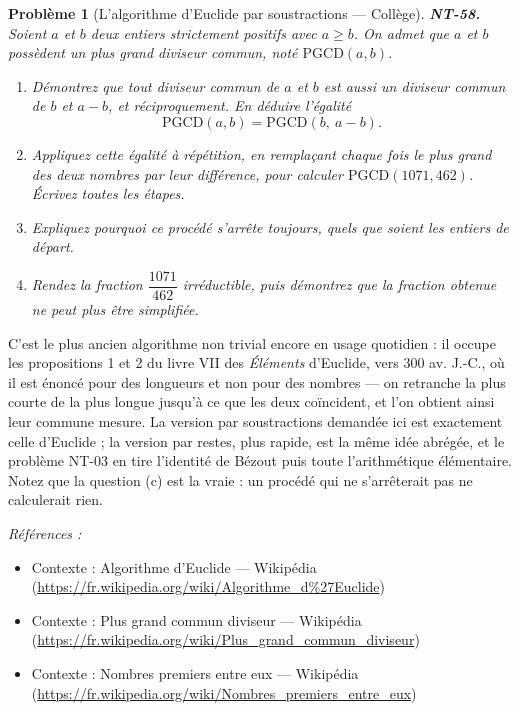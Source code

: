 \documentclass[11pt]{article}
\newtheorem{problem}{Problème}
\newenvironment{refs}{\par\small\noindent\emph{Références :}\begin{itemize}\setlength\itemsep{0pt}}{\end{itemize}\normalsize}
\begin{document}
\bigskip

\begin{problem}[{L'algorithme d'Euclide par soustractions --- Collège}]
\textbf{NT-58.} Soient $ a $ et $ b $ deux entiers strictement positifs avec
$ a \ge b $. On admet que $ a $ et $ b $ possèdent un plus grand diviseur commun, noté
$ \mathrm{PGCD}(a, b) $.
\begin{enumerate}
\item[(a)] Démontrez que tout diviseur commun de $ a $ et $ b $ est aussi un diviseur commun de $ b $
et $ a - b $, et réciproquement. En déduire l'égalité
\[ \mathrm{PGCD}(a, b) = \mathrm{PGCD}(b,\ a - b) . \]
\item[(b)] Appliquez cette égalité à répétition, en remplaçant chaque fois le plus grand des deux nombres
par leur différence, pour calculer $ \mathrm{PGCD}(1071, 462) $. Écrivez toutes les étapes.
\item[(c)] Expliquez pourquoi ce procédé s'arrête toujours, quels que soient les entiers de départ.
\item[(d)] Rendez la fraction $ \dfrac{1071}{462} $ irréductible, puis démontrez que la fraction obtenue ne
peut plus être simplifiée.
\end{enumerate}

\end{problem}

\noindent C'est le plus ancien algorithme non trivial encore en usage quotidien : il occupe
les propositions 1 et 2 du livre VII des \textit{Éléments} d'Euclide, vers 300 av. J.-C., où il est
énoncé pour des longueurs et non pour des nombres --- on retranche la plus courte de la plus longue
jusqu'à ce que les deux coïncident, et l'on obtient ainsi leur commune mesure. La version par
soustractions demandée ici est exactement celle d'Euclide ; la version par restes, plus rapide, est
la même idée abrégée, et le problème NT-03 en tire l'identité de Bézout puis toute l'arithmétique
élémentaire. Notez que la question (c) est la vraie : un procédé qui ne s'arrêterait pas ne
calculerait rien.

\begin{refs}
\item Contexte : Algorithme d'Euclide --- Wikipédia (\url{https://fr.wikipedia.org/wiki/Algorithme_d%27Euclide})
\item Contexte : Plus grand commun diviseur --- Wikipédia (\url{https://fr.wikipedia.org/wiki/Plus_grand_commun_diviseur})
\item Contexte : Nombres premiers entre eux --- Wikipédia (\url{https://fr.wikipedia.org/wiki/Nombres_premiers_entre_eux})
\end{refs}
\end{document}
